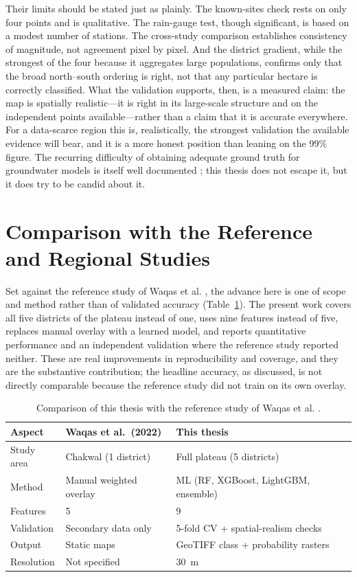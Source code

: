 Their limits should be stated just as plainly. The known-sites check rests on only
four points and is qualitative. The rain-gauge test, though significant, is based
on a modest number of stations. The cross-study comparison establishes consistency
of magnitude, not agreement pixel by pixel. And the district gradient, while the
strongest of the four because it aggregates large populations, confirms only that
the broad north--south ordering is right, not that any particular hectare is
correctly classified. What the validation supports, then, is a measured claim: the
map is spatially realistic---it is right in its large-scale structure and on the
independent points available---rather than a claim that it is accurate everywhere.
For a data-scarce region this is, realistically, the strongest validation the
available evidence will bear, and it is a more honest position than leaning on the
99\% figure. The recurring difficulty of obtaining adequate ground truth for
groundwater models is itself well documented \cite{hai2022gwlreview}; this thesis
does not escape it, but it does try to be candid about it.

\section{Comparison with the Reference and Regional Studies}
\label{sec:discuss_comparison}

Set against the reference study of Waqas et al. \cite{waqas2022chakwal}, the
advance here is one of scope and method rather than of validated accuracy
(Table~\ref{tab:comparison}). The present work covers all five districts of the
plateau instead of one, uses nine features instead of five, replaces manual
overlay with a learned model, and reports quantitative performance and an
independent validation where the reference study reported neither. These are real
improvements in reproducibility and coverage, and they are the substantive
contribution; the headline accuracy, as discussed, is not directly comparable
because the reference study did not train on its own overlay.

\begin{table}[H]
\centering
\caption{Comparison of this thesis with the reference study of Waqas et al.
         \cite{waqas2022chakwal}.}
\label{tab:comparison}
\small
\begin{tabular}{lll}
\toprule
Aspect & Waqas et al.\ (2022) & This thesis \\
\midrule
Study area & Chakwal (1 district) & Full plateau (5 districts) \\
Method     & Manual weighted overlay & ML (RF, XGBoost, LightGBM, ensemble) \\
Features   & 5 & 9 \\
Validation & Secondary data only & 5-fold CV + spatial-realism checks \\
Output     & Static maps & GeoTIFF class + probability rasters \\
Resolution & Not specified & 30~m \\
\bottomrule
\end{tabular}
\end{table}

